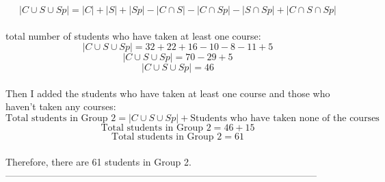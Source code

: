 \documentclass{amsart}
\theoremstyle{definition}
\theoremstyle{Exercise}
\theoremstyle{remark}
\theoremstyle{rule}
\numberwithin{equation}{section}
\begin{document}
\begin{enumerate}[label=(\roman*)]
\[ |C \cup S \cup Sp| = |C| + |S| + |Sp| - |C \cap S| - |C \cap Sp| - |S \cap Sp| + |C \cap S \cap Sp| \]\\
total number of students who have taken at least one course:\\
\[ |C \cup S \cup Sp| = 32 + 22 + 16 - 10 - 8 - 11 + 5 \]
\[ |C \cup S \cup Sp| = 70 - 29 + 5 \]
\[ |C \cup S \cup Sp| = 46 \]\\
Then I added the students who have taken at least one course and those who haven't taken any courses:\\
\[ \text{Total students in Group 2} = |C \cup S \cup Sp| + \text{Students who have taken none of the courses} \]
\[ \text{Total students in Group 2} = 46 + 15 \]
\[ \text{Total students in Group 2} = 61 \]\\
Therefore, there are 61 students in Group 2.\\
--------------------------------------------------------------------------------------------------\\
\\\\\
         \end{enumerate}
 \newpage
\end{document}
